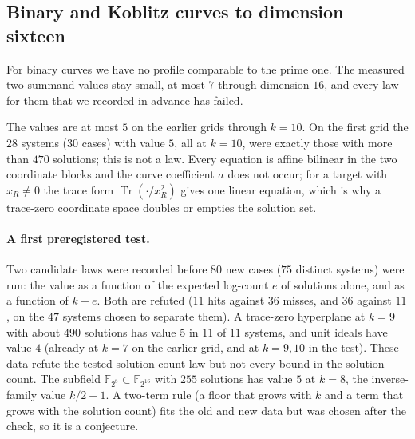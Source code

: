 \documentclass[11pt]{article}
\theoremstyle{definition}\newtheorem{definition}[theorem]{Definition}
\theoremstyle{remark}\newtheorem{remark}[theorem]{Remark}
\newcommand{\F}{\mathbb F}
\begin{document}
\subsection{Binary and Koblitz curves to dimension sixteen}\label{sec:binarydeep}
For binary curves we have no profile comparable to the prime one. The
measured two-summand values stay small, at most $7$ through dimension $16$,
and every law for them that we recorded in advance has failed.

The values are at most $5$ on the earlier grids through $k=10$. On the
first grid the $28$ systems ($30$ cases) with value $5$, all at $k=10$, were
exactly those with more than $470$ solutions; this is not a law. Every
equation is affine bilinear in the two coordinate blocks and the curve
coefficient $a$ does not occur; for a target with $x_R\ne0$ the trace form
$\operatorname{Tr}(\cdot/x_R^2)$ gives one linear equation, which is why a
trace-zero coordinate space doubles or empties the solution set.

\paragraph{A first preregistered test.} Two candidate laws were recorded
before $80$ new cases ($75$ distinct systems) were run: the value as a
function of the expected log-count $e$ of solutions alone, and as a
function of $k+e$. Both are refuted ($11$ hits against $36$ misses, and $36$
against $11$, on the $47$ systems chosen to separate them). A trace-zero
hyperplane at $k=9$ with about $490$ solutions has value $5$ in $11$ of
$11$ systems, and unit ideals have value $4$ (already at $k=7$ on the
earlier grid, and at $k=9,10$ in the test). These data refute the tested
solution-count law but not every bound in the solution count. The subfield
$\F_{2^8}\subset\F_{2^{16}}$ with $255$ solutions has value $5$ at $k=8$,
the inverse-family value $k/2+1$. A two-term rule (a floor that grows with
$k$ and a term that grows with the solution count) fits the old and new data
but was chosen after the check, so it is a conjecture.
\end{document}
